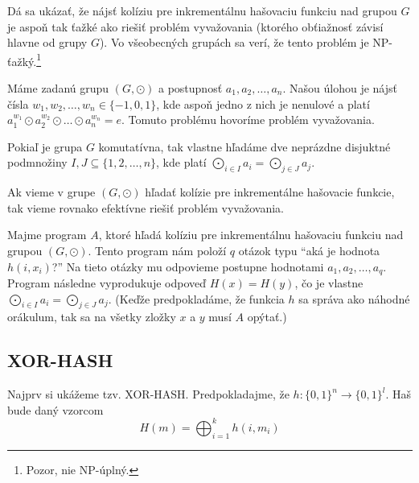 Dá sa ukázať, že nájsť kolíziu pre inkrementálnu hašovaciu
funkciu nad grupou $G$ je aspoň tak ťažké ako riešiť
problém vyvažovania (ktorého obťiažnosť závisí hlavne od grupy 
$G$). Vo všeobecných grupách sa verí, že tento problém je
NP-ťažký.\footnote{Pozor, nie NP-úplný.}

\begin{definicia}
    Máme zadanú grupu $(G, \odot)$ a postupnosť $a_1, a_2, \dots, a_n$.
    Našou úlohou je nájsť čísla $w_1, w_2, \dots, w_n \in \{-1, 0, 1\}$,
    kde aspoň jedno z nich je nenulové a platí 
    $a_1^{w_1} \odot a_2^{w_2} \odot \dots \odot a_n^{w_n} = e$.
    Tomuto problému hovoríme problém vyvažovania.
\end{definicia}

\begin{poznamka}
    Pokiaľ je grupa $G$ komutatívna, tak vlastne hľadáme
    dve neprázdne disjuktné podmnožiny
    $I, J \subseteq \{1, 2, \dots, n\}$, kde platí 
    $\bigodot_{i\in I} a_i = \bigodot_{j \in J} a_j$.
\end{poznamka}

\begin{lema}
    Ak vieme v grupe $(G, \odot)$ hľadať kolízie pre inkrementálne hašovacie
    funkcie, tak vieme rovnako efektívne riešiť problém vyvažovania.
\end{lema}

\begin{dokaz}
    Majme program $A$, ktoré hľadá kolíziu pre inkrementálnu hašovaciu
    funkciu nad grupou $(G, \odot)$. Tento program nám položí $q$ otázok
    typu ``aká je hodnota $h(i, x_i)$?'' Na tieto otázky mu odpovieme postupne
    hodnotami $a_1, a_2, \dots, a_q$.
    Program následne vyprodukuje odpoveď $H(x) = H(y)$, čo je vlastne 
    $\bigodot_{i \in I} a_i = \bigodot_{j \in J} a_j$.
    (Keďže predpokladáme, že funkcia $h$ sa správa ako náhodné orákulum,
    tak sa na všetky zložky $x$ a $y$ musí $A$ opýtať.)
\end{dokaz}

\subsection{XOR-HASH}

Najprv si ukážeme tzv. XOR-HASH.
Predpokladajme, že $h\colon \{0,1\}^n \to \{0,1\}^l$.
Haš bude daný vzorcom
\begin{equation*}
    H(m) = \bigoplus_{i=1}^k h(i, m_i)
\end{equation*}

